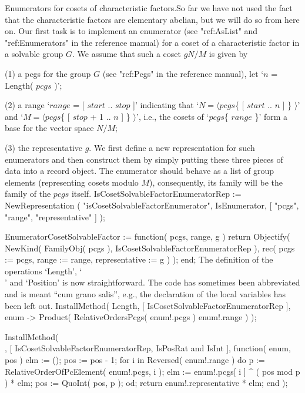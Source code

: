 {\bsf Enumerators for cosets of  characteristic factors.}\quad So far  we
have  not used the  fact that  the characteristic  factors are elementary
abelian, but we will do so from  here on. Our  first task is to implement
an enumerator (see "ref:AsList" and "ref:Enumerators"  in  the  reference
manual) for a coset of a characteristic factor in a solvable  group  $G$.
We assume that such a coset $gN/M$ is given by
\beginlist
\item{(1)}  a pcgs for  the group  $G$ (see  "ref:Pcgs" in the  reference
  manual), let `$n$ = Length( $pcgs$ )';
\item{(2)} a range `$range$ = [ $start$  .. $stop$ ]' indicating that `$N
  =  \langle pcgs$\{ [ $start$  .. $n$ ] \} $\rangle$'  and `$M = \langle
  pcgs$\{  [  $stop$ + 1   .. $n$ ]  \} $\rangle$',  i.e.,  the cosets of
  `$pcgs$\{ $range$ \}' form a base for the vector space $N/M$;
\item{(3)} the representative $g$.
\endlist
We   first  define a  new representation  for   such enumerators and then
construct them by simply putting these three pieces of data into a record
object. The  enumerator  should  behave as  a   list of  group   elements
(representing cosets modulo $M$),   consequently, its family will  be the
family of the $pcgs$ itself.
\begintt
IsCosetSolvableFactorEnumeratorRep := NewRepresentation
    ( "isCosetSolvableFactorEnumerator", IsEnumerator,
                                [ "pcgs", "range", "representative" ] );

EnumeratorCosetSolvableFactor := function( pcgs, range, g )
    return Objectify( NewKind( FamilyObj( pcgs ),
                   IsCosetSolvableFactorEnumeratorRep ),
                   rec( pcgs := pcgs,
                       range := range,
              representative := g ) );
end;
\endtt
The definition of the operations `Length', `\\[\\]' and `Position' is now
straightforward. The  code has sometimes  been  abbreviated and is  meant
``cum grano salis'',  e.g.,  the declaration of  the local  variables has
been left out.
\begintt
InstallMethod( Length, [ IsCosetSolvableFactorEnumeratorRep ],
    enum -> Product( RelativeOrdersPcgs( enum!.pcgs ){ enum!.range } ) );
\endtt

\begintt
InstallMethod( \[\], [ IsCosetSolvableFactorEnumeratorRep,
        IsPosRat and IsInt ],
    function( enum, pos )
    elm := ();
    pos := pos - 1;
    for i  in Reversed( enum!.range )  do
        p := RelativeOrderOfPcElement( enum!.pcgs, i );
        elm := enum!.pcgs[ i ] ^ ( pos mod p ) * elm;
        pos := QuoInt( pos, p );
    od;
    return enum!.representative * elm;
end );
\endtt

